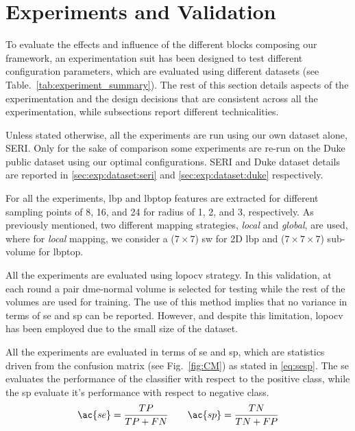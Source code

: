 
\section{Experiments and Validation}
\label{sec:exp} \label{sec:exp:datasets}

To evaluate the effects and influence of the different blocks composing our framework, an experimentation suit has been designed to test different configuration parameters, which are evaluated using different datasets (see Table.~\ref{tab:experiment_summary}).
The rest of this section details aspects of the experimentation and the design decisions that are consistent across all the experimentation, while subsections report different technicalities.

Unless stated otherwise, all the experiments are run using our own dataset alone, SERI.
Only for the sake of comparison some experiments are re-run on the Duke public dataset using our optimal configurations.
SERI and Duke dataset details are reported in \ref{sec:exp:dataset:seri} and \ref{sec:exp:dataset:duke} respectively.

For all the experiments, \ac{lbp} and \ac{lbptop} features are extracted for different sampling points of 8, 16, and 24 for radius of 1, 2, and 3, respectively.
As previously mentioned, two different mapping strategies, \emph{local} and \emph{global}, are used, where for \emph{local} mapping, we consider a ($7 \times 7$) \acf{sw} for 2D \ac{lbp} and ($ 7 \times 7 \times 7$) sub-volume for \ac{lbptop}.

All the experiments are evaluated using \ac{lopocv} strategy.
In this validation, at each round a pair \ac{dme}-normal volume is selected for testing while the rest of the volumes are used for training.
The use of this method implies that no variance in terms of \ac{se} and \ac{sp} can be reported.
However, and despite this limitation, \ac{lopocv} has been employed due to the small size of the dataset.

All the experiments are evaluated in terms of \ac{se} and \ac{sp}, which are statistics driven from the confusion matrix (see Fig.~\ref{fig:CM}) as stated in \cref{eq:sesp}.
The \ac{se} evaluates the performance of the classifier with respect to the positive class, while the \ac{sp} evaluate it's performance with respect to negative class.
\begin{align}
 \ac{se}  = \frac{TP}{TP+FN} \qquad \ac{sp} = \frac{TN}{TN+FP}
 \label{eq:sesp}
\end{align}

